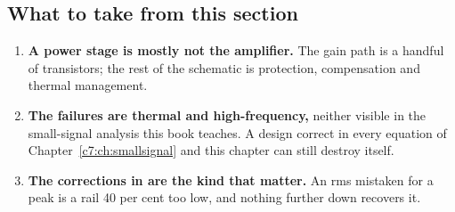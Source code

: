 \subsection{What to take from this section}
\label{c8:sec:c6}
\begin{enumerate}
  \item \textbf{A power stage is mostly not the amplifier.} The gain path is a handful of transistors; the rest of the schematic is protection, compensation and thermal management.
  \item \textbf{The failures are thermal and high-frequency,} neither visible in the small-signal analysis this book teaches. A design correct in every equation of Chapter~\ref{c7:ch:smallsignal} and this chapter can still destroy itself.
  \item \textbf{The corrections in  are the kind that matter.} An rms mistaken for a peak is a rail 40 per cent too low, and nothing further down recovers it.
\end{enumerate}
